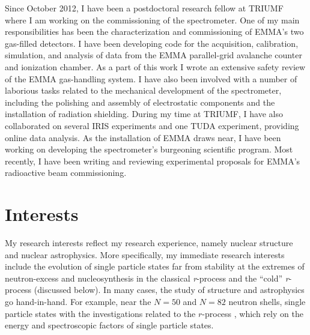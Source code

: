 Since October 2012,
I have been a postdoctoral research fellow at TRIUMF where I am working
on the commissioning of the %
spectrometer. %
 One of my main responsibilities has been the characterization and commissioning of EMMA's two gas-filled detectors. %
 I have been developing code for the acquisition, calibration, simulation, and analysis of data from the EMMA parallel-grid avalanche counter and ionization chamber.%
As a part of this work I wrote an extensive safety review of the EMMA gas-handling system. I have also been involved with a number of laborious tasks related to the mechanical development of the spectrometer, including the polishing and assembly of  electrostatic components and the installation of radiation shielding.
		During my time at TRIUMF,  I have also collaborated on several IRIS experiments and one TUDA experiment, providing online data analysis.
		 As the installation of EMMA draws near, I have been working on developing the  spectrometer's burgeoning scientific program.	Most recently, I have been writing and reviewing %
		experimental proposals for EMMA's radioactive beam commissioning.

\section*{Interests}
My research interests reflect my research experience, namely nuclear structure and nuclear astrophysics.  More specifically, my immediate 
research interests include %
 the evolution of single particle states far from stability at the extremes of neutron-excess and nucleosynthesis in the classical \textit{r}-process and the ``cold'' \textit{r}-process (discussed below). In many cases, the study of structure
and astrophysics go hand-in-hand. For example, %
near the $N=50$ and $N=82$ neutron shells,  single particle states  with the investigations related to the $r$-process%
, which rely on the energy and spectroscopic factors of single particle states.

